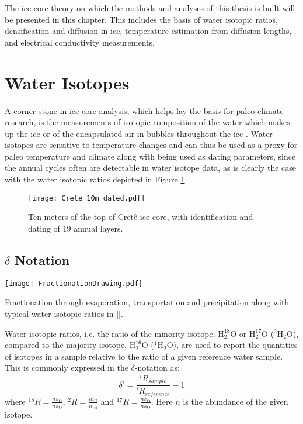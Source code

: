 \documentclass[../../CompleteThesis2/Complete_2ndDraft]{subfiles}
\begin{document}
The ice core theory on which the methods and analyses of this thesis is built will be presented in this chapter. This includes the basis of water isotopic ratios, densification and diffusion in ice, temperature estimation from diffusion lengths, and electrical conductivity measurements.
\minitoc

\section[Water Isotopes][Water Isotopes]{Water Isotopes}
\label{Sec:Ice_WaterIsotopes}

A corner stone in ice core analysis, which helps lay the basis for paleo climate research, is the measurements of isotopic composition of the water which makes up the ice or of the encapsulated air in bubbles throughout the ice \cite[V. Gkinis et al., 2011]{WaterIsoRatios}. Water isotopes are sensitive to temperature changes and can thus be used as a proxy for paleo temperature and climate along with being used as dating parameters, since the annual cycles often are detectable in water isotope data, as is clearly the case with the water isotopic ratios depicted in Figure \ref{Fig:ICE_Crete_10m_dated}.

\begin{figure}[h]
	\centering
	\texttt{[image: Crete\_10m\_dated.pdf]}
	\caption[10 m of Crête ice core with dating]{\small Ten meters of the top of Cretê ice core, with identification and dating of 19 annual layers.}
	\label{Fig:ICE_Crete_10m_dated}
\end{figure}


\subsection[$\delta$ Notation]{$\delta$ Notation}
\label{Subsec:Ice_WaterIsotopes_deltaNotation}

\begin{marginfigure}
	\centering
	\texttt{[image: FractionationDrawing.pdf]}
	\caption[Fractionation]{\footnotesize Fractionation through evaporation, transportation and precipitation along with typical water isotopic ratios in [\permil].}
	\label{Fig:ICE_ISO_Fractionation}
\end{marginfigure}

Water isotopic ratios, i.e. the ratio of the minority isotope, ${\text{H}_2^{18}\text{O}}$ or ${\text{H}_2^{17}\text{O}}$ ($^2\text{H}_2\text{O}$), compared to the majority isotope, ${\text{H}_2^{16}\text{O}}$ ($^1\text{H}_2\text{O}$), are used to report the quantities of isotopes in a sample relative to the ratio of a given reference water sample. This is commonly expressed in the $\delta$-notation as:
\begin{equation}
	\delta^i = \frac{^iR_{sample}}{^iR_{reference}} - 1		
\end{equation}
where $^{18}R = \frac{n_{^{18}\text{O}}}{n_{^{16}\text{O}}}	$, $^{2}R = \frac{n_{^{2}\text{H}}}{n_{^{1}\text{H}}}$  and $^{17}R = \frac{n_{^{17}\text{O}}}{n_{^{16}\text{O}}}$. Here $n$ is the abundance of the given isotope.%
\end{document}
